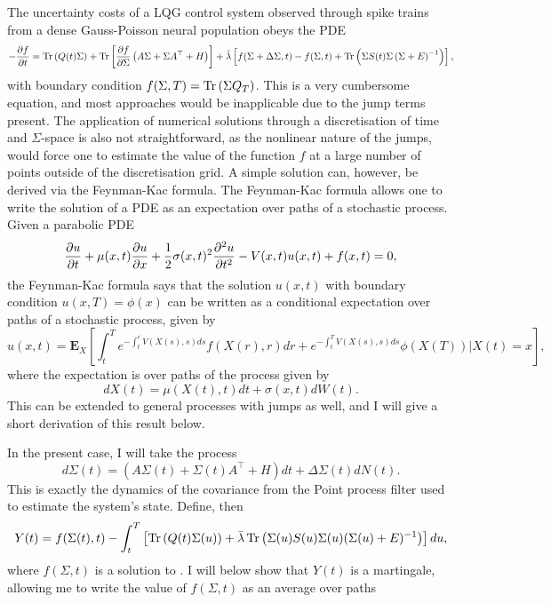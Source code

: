 The uncertainty costs of a LQG control system observed through spike trains from a dense Gauss-Poisson neural population obeys the PDE
\begin{equation}
-\frac{\partial f}{\partial t} = \operatorname{Tr}\left(Q(t) \Sigma\right) + \operatorname{Tr}\left[\frac{\partial f}{\partial \Sigma} \left(A\Sigma + \Sigma A^\top + H\right)\right] + \hat{\lambda} \left[f(\Sigma+\Delta\Sigma,t) - f(\Sigma,t) + \operatorname{Tr}\left(\Sigma S(t) \Sigma \left(\Sigma+E\right)^{-1}\right)\right]\nonumber,
\end{equation}
with boundary condition $f(\Sigma,T) = \operatorname{Tr}\left(\Sigma Q_T\right)$.
This is a very cumbersome equation, and most approaches would be inapplicable due to the jump terms present. The application of numerical solutions through a discretisation of time and
$\Sigma$-space is also not straightforward, as the nonlinear nature of the jumps, would force one to estimate the value of the function $f$ at a large number of points outside of the 
discretisation grid. A simple solution can, however, be derived via the Feynman-Kac formula. The Feynman-Kac formula allows one to write the solution of a PDE as an expectation
over paths of a stochastic process. Given a parabolic PDE
\[
\frac{\partial u}{\partial t} + \mu(x,t) \frac{\partial u}{\partial x} + \frac{1}{2} \sigma(x,t)^2 \frac{\partial ^2u}{\partial t^2} - V(x,t) u(x,t) + f(x,t) =0,
\]
the Feynman-Kac formula says that the solution $u(x,t)$ with boundary condition $u(x,T) = \phi(x)$ can be written as a conditional expectation over paths of a stochastic process, given by
\[
u(x,t) = \boldsymbol{E}_X\left[\int_t^T e^{-\int_t^r V(X(s),s) ds} f(X(r),r) dr + e^{-\int_t^T V(X(s),s) ds} \phi(X(T))\mathrel{\bigg|} X(t) = x\right],
\]
where the expectation is over paths of the process given by
\[
dX(t) = \mu(X(t),t) dt + \sigma(x,t) dW(t).
\]
This can be extended to general processes with jumps as well, and I will give a short derivation of this result below.
\par
In the present case, I will take the process
\begin{equation}
\label{eq:fk_sigma}
d\Sigma(t) = (A\Sigma(t) + \Sigma(t) A^\top  + H) dt + \Delta \Sigma(t) dN(t).
\end{equation}
This is exactly the dynamics of the covariance from the Point process filter used to estimate the system's state.
Define, then
\[
Y(t) = f(\Sigma(t),t) -  \int_t^T \left[\operatorname{Tr}\left(Q(t)\Sigma(u)\right)+ \bar{\lambda} \operatorname{Tr} \left(\Sigma(u) S(u)\Sigma(u)(\Sigma(u)+E)^{-1}\right)\right]du,
\]
where $f(\Sigma,t)$ is a solution to . I will below show that $Y(t)$ is a martingale, allowing me to write the value of $f(\Sigma,t)$ as an average over paths
